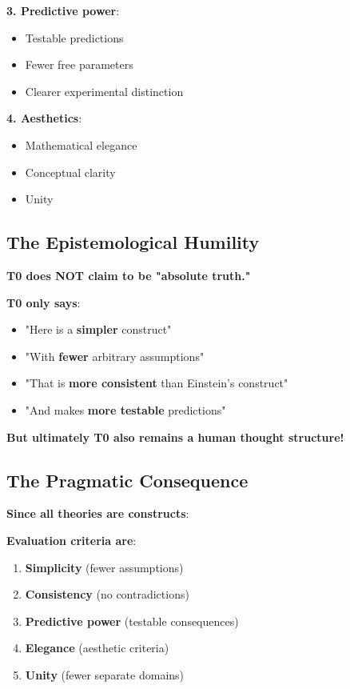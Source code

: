 \documentclass[12pt,a4paper]{article}
\begin{document}
	\textbf{3. Predictive power}:
	\begin{itemize}
		\item Testable predictions
		\item Fewer free parameters
		\item Clearer experimental distinction
	\end{itemize}
	
	\textbf{4. Aesthetics}:
	\begin{itemize}
		\item Mathematical elegance
		\item Conceptual clarity
		\item Unity
	\end{itemize}
	
	\subsection{The Epistemological Humility}
	
	\textbf{T0 does NOT claim to be "absolute truth."}
	
	\textbf{T0 only says}:
	\begin{itemize}
		\item "Here is a \textbf{simpler} construct"
		\item "With \textbf{fewer} arbitrary assumptions"
		\item "That is \textbf{more consistent} than Einstein's construct"
		\item "And makes \textbf{more testable} predictions"
	\end{itemize}
	
	\textbf{But ultimately T0 also remains a human thought structure!}
	
	\subsection{The Pragmatic Consequence}
	
	\textbf{Since all theories are constructs}:
	
	\textbf{Evaluation criteria are}:
	\begin{enumerate}
		\item \textbf{Simplicity} (fewer assumptions)
		\item \textbf{Consistency} (no contradictions)
		\item \textbf{Predictive power} (testable consequences)
		\item \textbf{Elegance} (aesthetic criteria)
		\item \textbf{Unity} (fewer separate domains)
	\end{enumerate}
	
\end{document}
